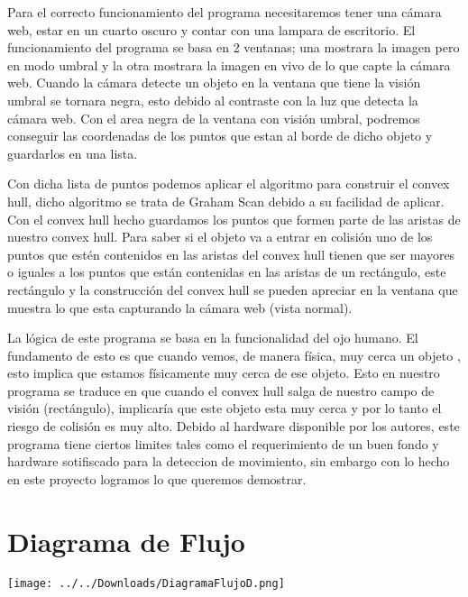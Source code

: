 \documentclass[]{article}
\begin{document}
Para el correcto funcionamiento del programa necesitaremos tener una cámara web, estar en un cuarto oscuro y contar con una lampara de escritorio. El funcionamiento del programa se basa en 2 ventanas; una mostrara la imagen pero en modo umbral y la otra mostrara la imagen en vivo de lo que capte la cámara web. Cuando la cámara detecte un objeto en la ventana que tiene la visión umbral se tornara negra, esto debido al contraste con la luz que detecta la cámara web. Con el area negra de la ventana con visión umbral, podremos conseguir las coordenadas de los puntos que estan al borde de dicho objeto y guardarlos en una lista.

Con dicha lista de puntos podemos aplicar el algoritmo para construir el convex hull, dicho algoritmo se trata de Graham Scan debido a su facilidad de aplicar. Con el convex hull hecho guardamos los puntos que formen parte de las aristas de nuestro convex hull. Para saber si el objeto va a entrar en colisión uno de los puntos que estén contenidos en las aristas del convex hull tienen que ser mayores o iguales a los puntos que están contenidas en las aristas de un rectángulo, este rectángulo y la construcción del convex hull se pueden apreciar en la ventana que muestra lo que esta capturando la cámara web (vista normal).

La lógica de este programa se basa en la funcionalidad del ojo humano. El fundamento de esto es que cuando vemos, de manera física, muy cerca un objeto , esto implica que estamos físicamente muy cerca de ese objeto. Esto en nuestro programa se traduce en que cuando el convex hull salga de nuestro campo de visión (rectángulo), implicaría que este objeto esta muy cerca y por lo tanto el riesgo de colisión es muy alto. Debido al hardware disponible por los autores, este programa tiene ciertos limites tales como el requerimiento de un buen fondo y hardware sotifiscado para la deteccion de movimiento, sin embargo con lo hecho en este proyecto logramos lo que queremos demostrar.

\section{Diagrama de Flujo}
\texttt{[image: ../../Downloads/DiagramaFlujoD.png]}
\end{document}
